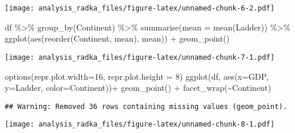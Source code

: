 \documentclass[
]{article}
\newenvironment{Shaded}{\begin{snugshade}}{\end{snugshade}}
\newcommand{\AttributeTok}[1]{\textcolor[rgb]{0.77,0.63,0.00}{#1}}
\newcommand{\DecValTok}[1]{\textcolor[rgb]{0.00,0.00,0.81}{#1}}
\newcommand{\FunctionTok}[1]{\textcolor[rgb]{0.00,0.00,0.00}{#1}}
\newcommand{\NormalTok}[1]{#1}
\newcommand{\SpecialCharTok}[1]{\textcolor[rgb]{0.00,0.00,0.00}{#1}}
\begin{document}
\texttt{[image: analysis\_radka\_files/figure-latex/unnamed-chunk-6-2.pdf]}

\begin{Shaded}
\begin{Highlighting}[]
\NormalTok{df }\SpecialCharTok{\%\textgreater{}\%}
  \FunctionTok{group\_by}\NormalTok{(Continent) }\SpecialCharTok{\%\textgreater{}\%}
  \FunctionTok{summarise}\NormalTok{(}\AttributeTok{mean =} \FunctionTok{mean}\NormalTok{(Ladder)) }\SpecialCharTok{\%\textgreater{}\%}
  \FunctionTok{ggplot}\NormalTok{(}\FunctionTok{aes}\NormalTok{(}\FunctionTok{reorder}\NormalTok{(Continent, mean), mean)) }\SpecialCharTok{+} 
  \FunctionTok{geom\_point}\NormalTok{()}
\end{Highlighting}
\end{Shaded}

\texttt{[image: analysis\_radka\_files/figure-latex/unnamed-chunk-7-1.pdf]}

\begin{Shaded}
\begin{Highlighting}[]
\FunctionTok{options}\NormalTok{(}\AttributeTok{repr.plot.width=}\DecValTok{16}\NormalTok{, }\AttributeTok{repr.plot.height =} \DecValTok{8}\NormalTok{)}
\FunctionTok{ggplot}\NormalTok{(df, }\FunctionTok{aes}\NormalTok{(}\AttributeTok{x=}\NormalTok{GDP, }\AttributeTok{y=}\NormalTok{Ladder, }\AttributeTok{color=}\NormalTok{Continent))}\SpecialCharTok{+}
  \FunctionTok{geom\_point}\NormalTok{() }\SpecialCharTok{+}
  \FunctionTok{facet\_wrap}\NormalTok{(}\SpecialCharTok{\textasciitilde{}}\NormalTok{Continent)}
\end{Highlighting}
\end{Shaded}

\begin{verbatim}
## Warning: Removed 36 rows containing missing values (geom_point).
\end{verbatim}

\texttt{[image: analysis\_radka\_files/figure-latex/unnamed-chunk-8-1.pdf]}
\end{document}

